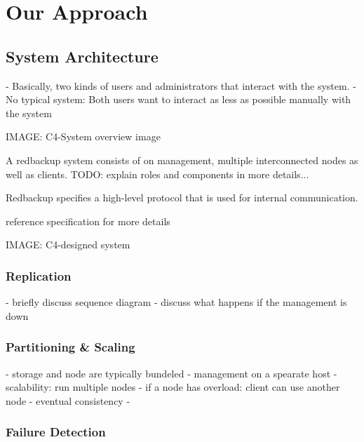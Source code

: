 \chapter{Our Approach}
\label{sec:our-approach}

\section{System Architecture}

- Basically, two kinds of users and administrators that interact with the system.
- No typical system: Both users want to interact as less as possible manually with the system 

IMAGE: C4-System overview image

A redbackup system consists of on management, multiple interconnected nodes as well as clients.
TODO: explain roles and components in more details...

Redbackup specifies a high-level protocol that is used for internal communication.

reference specification for more details

IMAGE: C4-designed system


\subsection{Replication}

- briefly discuss sequence diagram
- discuss what happens if the management is down

\subsection{Partitioning \& Scaling}

- storage and node are typically bundeled
- management on a spearate host
- scalability: run multiple nodes
 - if a node has overload: client can use another node
 - eventual consistency
- 


\subsection{Failure Detection}

